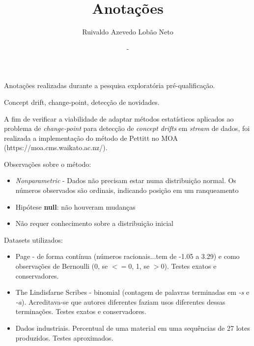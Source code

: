 \documentclass[qual, classic, a4paper]{ufbathesis}
\institute{Instituto de Matem\'{a}tica}
\title{Anotações}
\date{-}
\author{Ruivaldo Azevedo Lobão Neto}
\begin{document}





\resumo
Anotações realizadas durante a pesquisa exploratória pré-qualificação.

\begin{keywords}
	Concept drift, change-point, detecção de novidades.
\end{keywords}


\mainmatter

% 
% 
% 
%



A fim de verificar a viabilidade de adaptar métodos estatísticos aplicados ao
problema de \textit{change-point} para detecção de \textit{concept drifts} em
\textit{stream} de dados, foi realizada a implementação do método de Pettitt
\cite{Pettitt} no MOA (https://moa.cms.waikato.ac.nz/).

Observações sobre o método:

\begin{itemize}
	\item \textit{Nonparametric} - Dados não precisam estar numa distribuição normal. Os números observados são ordinais, indicando posição em um ranqueamento
	\item Hipótese \textbf{null}: não houveram mudanças
	\item Não requer conhecimento sobre a distribuição inicial
\end{itemize}

Datasets utilizados:

\begin{itemize}
	\item Page \cite{Page} - de forma contínua (números racionais...tem de -1.05 a 3.29) e como
	      observações de Bernoulli (0, se $<= 0$, 1, se $> 0$). Testes exatos e conservadores.

	\item The Lindisfarne Scribes - binomial (contagem de palavras terminadas em \textit{-s} e \textit{-a}). Acreditava-se que autores diferentes faziam usos diferentes dessas terminações. Testes exatos e conservadores.

	\item Dados industriais. Percentual de uma material em uma sequências de 27 lotes produzidos. Testes aproximados.
\end{itemize}
\end{document}
